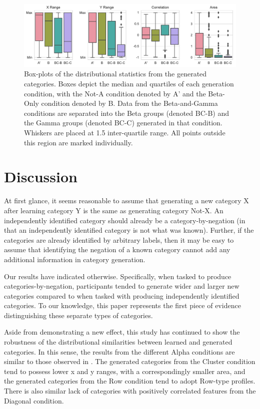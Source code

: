 \documentclass[10pt,letterpaper]{article}
\begin{document}
\begin{figure}%
\begin{center}
    \includegraphics[width=\textwidth]{Figures/stats_instr.pdf}
\end{center}
\caption{Box-plots of the distributional statistics from the generated categories. Boxes depict the median and quartiles of each generation condition, with the Not-A condition denoted by A' and the Beta-Only condition denoted by B. Data from the Beta-and-Gamma conditions are separated into the Beta groups (denoted BC-B) and the Gamma groups (denoted BC-C) generated in that condition. Whiskers are placed at 1.5 inter-quartile range. All points outside this region are marked individually.} 
\label{fig:stats_instr}
\end{figure}

\section{Discussion}
At first glance, it seems reasonable to assume that generating a new category X after learning category Y is the same as generating category Not-X. An independently identified category should already be a category-by-negation (in that an independently identified category is not what was known). Further, if the categories are already identified by arbitrary labels, then it may be easy to assume that identifying the negation of a known category cannot add any additional information in category generation.  

Our results have indicated otherwise. Specifically, when tasked to produce categories-by-negation, participants tended to generate wider and larger new categories compared to when tasked with producing independently identified categories. To our knowledge, this paper represents the first piece of evidence distinguishing these separate types of categories. 

Aside from demonstrating a new effect, this study has continued to show the robustness of the distributional similarities between learned and generated categories. In this sense, the results from the different Alpha conditions are similar to those observed in . The generated categories from the Cluster condition tend to possess lower x and y ranges, with a correspondingly smaller area, and the generated categories from the Row condition tend to adopt Row-type profiles. There is also similar lack of categories with positively correlated features from the Diagonal condition.  
\end{document}

